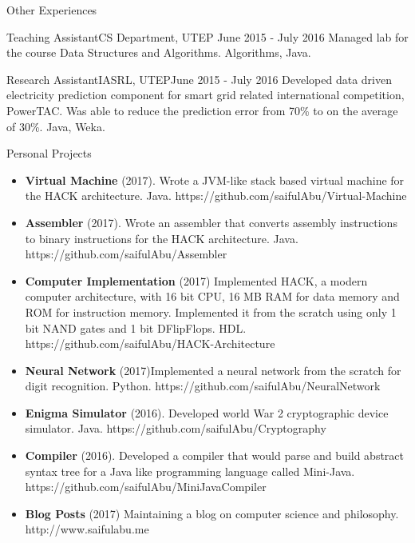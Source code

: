 \documentclass[]{mcdowellcv}
\begin{document}
	\begin{cvsection}{Other Experiences}
		\begin{cvsubsection}{Teaching Assistant}{CS Department, UTEP }{June 2015 - July 2016}
			Managed lab for the course Data Structures and Algorithms. Algorithms, Java.
		\end{cvsubsection}
		\begin{cvsubsection}{Research Assistant}{IASRL, UTEP}{June 2015 - July 2016}
			Developed data driven electricity prediction component for smart grid related international competition, PowerTAC. Was able to reduce the prediction error from 70\% to on the average of 30\%. Java, Weka.
		\end{cvsubsection}
	\end{cvsection}
	
	\begin{cvsection}{Personal Projects}
		\begin{cvsubsection}{}{}{}
			\begin{itemize}
				\item \textbf{Virtual Machine} (2017). Wrote a JVM-like stack based virtual machine for the HACK architecture. Java. https://github.com/saifulAbu/Virtual-Machine 
				\item \textbf{Assembler} (2017). Wrote an assembler that converts assembly instructions to binary instructions for the HACK architecture. Java. https://github.com/saifulAbu/Assembler
				\item\textbf{Computer Implementation} (2017) Implemented HACK, a modern computer architecture, with 16 bit CPU, 16 MB RAM for data memory and ROM for instruction memory. Implemented it from the scratch using only 1 bit NAND gates and 1 bit DFlipFlops. HDL. https://github.com/saifulAbu/HACK-Architecture
				\item \textbf{Neural Network} (2017)Implemented a neural network from the scratch for digit recognition. Python. https://github.com/saifulAbu/NeuralNetwork 
				\item \textbf{Enigma Simulator} (2016).  Developed world War 2 cryptographic device simulator.  Java. https://github.com/saifulAbu/Cryptography
				\item \textbf{Compiler} (2016). Developed a compiler that would parse and build abstract syntax tree for a Java like programming language called Mini-Java. https://github.com/saifulAbu/MiniJavaCompiler
				\item \textbf{Blog Posts} (2017) Maintaining a blog on computer science and philosophy. http://www.saifulabu.me  
			\end{itemize}
		\end{cvsubsection}
	\end{cvsection}
	
\end{document}
